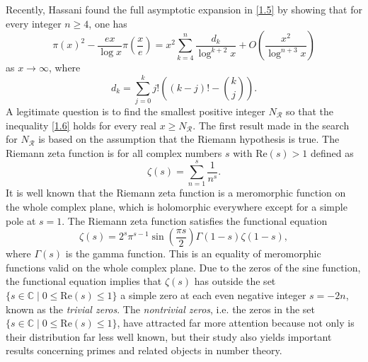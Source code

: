\documentclass[a4paper,12pt]{amsart}
\newcommand{\C}{\mathds{C}}
\newcommand{\q}{\quad}
\theoremstyle{definition}
\theoremstyle{remark}
\begin{document}
Recently, Hassani \cite[Corollary 1]{hassani2} found the full asymptotic expansion in \eqref{1.5} by showing that for every integer $n \geq 4$, one has
\begin{displaymath}
\pi(x)^2 - \frac{ex}{\log x} \pi \left( \frac{x}{e} \right) = x^2 \sum_{k=4}^n \frac{d_k}{\log^{k+2}x} + O \left(\frac{x^2}{\log^{n+3} x} \right)
\end{displaymath}
as $x \to \infty$, where
\begin{displaymath}
d_k = \sum_{j=0}^k j! \left( (k-j)! - \binom{k}{j} \right).
\end{displaymath}
A legitimate question is to find the smallest positive integer $N_{\mathcal{R}}$ so that the inequality \eqref{1.6} holds for every real $x \geq N_{\mathcal{R}}$.
The first result made in the search for $N_{\mathcal{R}}$ is based on the assumption that the Riemann hypothesis is true. The Riemann zeta function is for all complex numbers $s$ with $\text{Re}(s) > 1$ defined as
\begin{displaymath}
\zeta(s) = \sum_{n=1}^s \frac{1}{n^s}.
\end{displaymath}
It is well known that the Riemann zeta function is a meromorphic function on the whole complex plane, which is holomorphic everywhere except for a simple pole at $s = 1$.
The Riemann zeta function satisfies the functional equation
\begin{displaymath}
\zeta(s)= 2^s \pi^{s-1} \sin \left({\frac{\pi s}{2}} \right) \Gamma(1-s)\zeta (1-s),
\end{displaymath}
where $\Gamma(s)$ is the gamma function. This is an equality of meromorphic functions valid on the whole complex plane. Due to the zeros of the sine function, the functional equation implies that $\zeta(s)$ has outside the set $\{ s \in \C \mid 0 \leq \text{Re}(s) \leq 1 \}$ a simple zero at each even negative integer $s = -2n$, known as the \textit{trivial zeros}. The \textit{nontrivial zeros}, i.e. the zeros in the set $\{ s \in \C \mid 0 \leq \text{Re}(s) \leq 1 \}$, have attracted far more attention because not only is their distribution far less well known, but their study also yields important results concerning primes and related objects in number theory.
\end{document}
